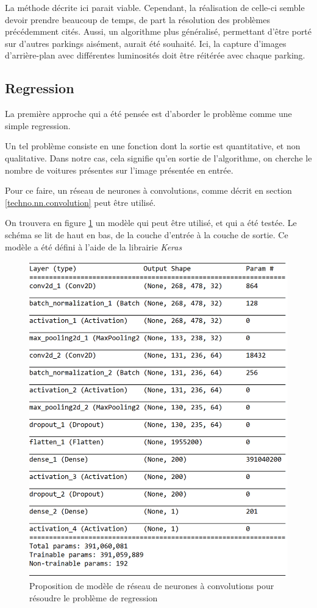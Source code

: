 La méthode décrite ici parait viable. Cependant, la réalisation de celle-ci semble devoir prendre beaucoup de temps, de part la résolution des problèmes précédemment cités. Aussi, un algorithme plus généralisé, permettant d'être porté sur d'autres parkings aisément, aurait été souhaité. Ici, la capture d'images d'arrière-plan avec différentes luminosités doit être réitérée avec chaque parking.


\subsection{Regression}\label{conception.model.regression}
La première approche qui a été pensée est d'aborder le problème comme une simple regression.

Un tel problème consiste en une fonction dont la sortie est quantitative, et non qualitative\autocite{wiki:regression}. Dans notre cas, cela signifie qu'en sortie de l'algorithme, on cherche le nombre de voitures présentes sur l'image présentée en entrée. 

Pour ce faire, un réseau de neurones à convolutions, comme décrit en section \ref{techno.nn.convolution}  peut être utilisé. 

On trouvera en figure \ref{fig:regression_keras} un modèle qui peut être utilisé, et qui a été testée. Le schéma se lit de haut en bas, de la couche d'entrée à la couche de sortie. Ce modèle a été défini à l'aide de la librairie \textit{Keras}

\begin{figure}[H]
    \includegraphics[width=12cm]{img/conception/nn/regression_keras.png}
    \centering
    \caption{Proposition de modèle de réseau de neurones à convolutions pour résoudre le problème de regression}
    \label{fig:regression_keras}
\end{figure} 

